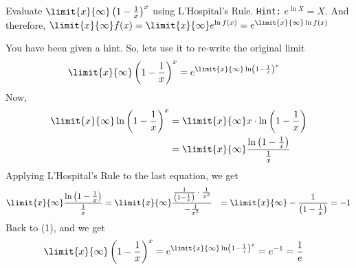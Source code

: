 

\question[4] Evaluate $\limit{x}{\infty}\left( 1-\frac{1}{x}\right)^x$ using L'Hospital's Rule.
\texttt{Hint:} $e^{\ln X} = X$. And therefore, $\limit{x}{\infty}f(x) = \limit{x}{\infty}e^{\ln f(x)} 
= e^{\limit{x}{\infty}\ln f(x)}$


\ifprintanswers
\fi 

\begin{solution}[\halfpage]
  You have been given a hint. So, lets use it to re-write the original limit 
  \begin{align}
    \limit{x}{\infty}\left( 1-\frac{1}{x} \right)^x &= e^{\limit{x}{\infty}\ln\left( 1-\frac{1}{x} \right)^x}
  \end{align}
  Now, 
  \begin{align}
    \limit{x}{\infty}\ln\left( 1-\frac{1}{x} \right)^x &= \limit{x}{\infty}x\cdot\ln\left( 1-\frac{1}{x}\right) \\
    &= \limit{x}{\infty}\dfrac{\ln\left(1-\frac{1}{x}\right)}{\frac{1}{x}}
  \end{align}
  Applying L'Hospital's Rule to the last equation, we get 
  \begin{align}
    \limit{x}{\infty}\dfrac{\ln\left(1-\frac{1}{x}\right)}{\frac{1}{x}} 
    &= \limit{x}{\infty}\dfrac{\frac{1}{\left( 1-\frac{1}{x}\right)}\cdot\frac{1}{x^2}}{-\frac{1}{x^2}}
    &= \limit{x}{\infty}-\dfrac{1}{\left( 1-\frac{1}{x}\right)} = -1
  \end{align}
  Back to (1), and we get 
  \begin{align}
    \limit{x}{\infty}\left( 1-\frac{1}{x} \right)^x 
    &= e^{\limit{x}{\infty}\ln\left( 1-\frac{1}{x} \right)^x} = e^{-1} = \dfrac{1}{e}
  \end{align}
\end{solution}

